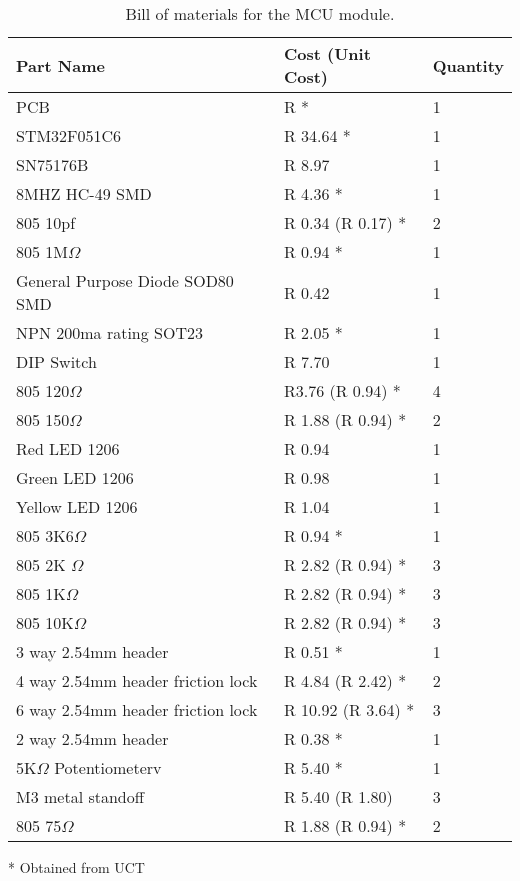 \documentclass[a4paper,11pt]{article}
\numberwithin{figure}{section}
\numberwithin{table}{section}
\begin{document}
	\begin{table}[ht]
	\centering		
	\begin{tabular}{| m{8cm} | m{4cm}| m{3cm} |}
	\hline
	\textbf{Part Name} & \textbf{Cost  (Unit Cost)} & \textbf{Quantity} \\
	\hline
	PCB & R * & 1 \\
	\hline
	STM32F051C6 & R 34.64 * & 1 \\
	\hline
	SN75176B & R 8.97 & 1 \\
	\hline
	8MHZ HC-49 SMD & R 4.36 * & 1 \\
	\hline
	805 10pf & R 0.34 (R 0.17) *  & 2 \\
	\hline
	805 1M$\Omega$ & R 0.94 * & 1 \\
	\hline
	General Purpose Diode SOD80 SMD & R 0.42 & 1 \\ 
	\hline
	NPN 200ma rating SOT23 & R 2.05 * & 1\\
	\hline
	DIP Switch & R 7.70 & 1 \\
	\hline
	805 120$\Omega$ & R3.76 (R 0.94) * & 4 \\
	\hline
	805 150$\Omega$ & R 1.88 (R 0.94) * & 2 \\
	\hline
	Red LED 1206 & R 0.94 & 1 \\
	\hline
	Green LED 1206 & R 0.98 & 1 \\
	\hline
	Yellow LED 1206 & R 1.04 & 1 \\
	\hline
	805 3K6$\Omega$ & R 0.94 * & 1 \\
	\hline
	805 2K $\Omega$ & R 2.82 (R 0.94) * & 3 \\
	\hline
	805 1K$\Omega$ & R 2.82 (R 0.94) * & 3 \\
	\hline
	805 10K$\Omega$ & R 2.82 (R 0.94) * & 3 \\
	\hline
	3 way 2.54mm header & R 0.51 * & 1 \\
	\hline
	4 way 2.54mm header friction lock & R 4.84 (R 2.42) * & 2 \\
	\hline
	6 way 2.54mm header friction lock & R 10.92 (R 3.64) * & 3 \\
	\hline
	2 way 2.54mm header & R 0.38 * & 1 \\
	\hline
	5K$\Omega$ Potentiometerv & R 5.40 * & 1 \\
	\hline
	M3 metal standoff & R 5.40 (R 1.80) & 3 \\
	\hline
	805 75$\Omega$ & R 1.88 (R 0.94) * & 2 \\ 
	\hline
	  
	\end{tabular}
	
	 * Obtained from UCT
	\caption{Bill of materials for the MCU module. \label{tab:bommcu}}
	\end{table}	
	\vfill
	\FloatBarrier
\newpage
\end{document}
